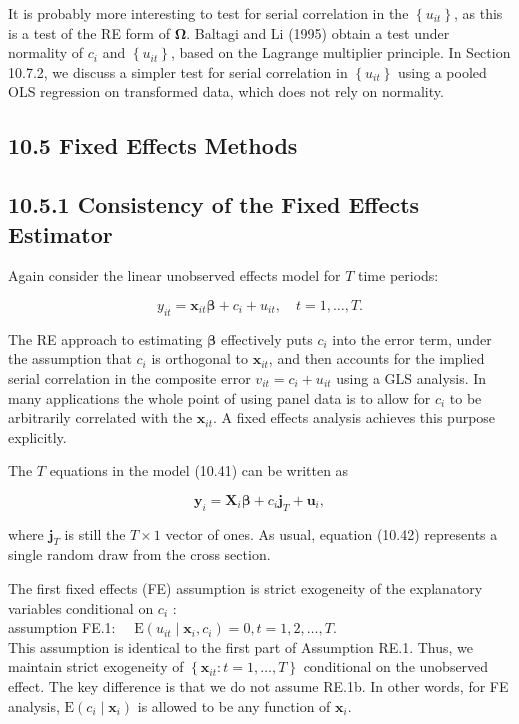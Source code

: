 \documentclass[10pt]{article}
\begin{document}
It is probably more interesting to test for serial correlation in the $\left\{u_{i t}\right\}$, as this is a test of the RE form of $\boldsymbol{\Omega}$. Baltagi and Li (1995) obtain a test under normality of $c_{i}$ and $\left\{u_{i t}\right\}$, based on the Lagrange multiplier principle. In Section 10.7.2, we discuss a simpler test for serial correlation in $\left\{u_{i t}\right\}$ using a pooled OLS regression on transformed data, which does not rely on normality.

\subsection*{10.5 Fixed Effects Methods}
\subsection*{10.5.1 Consistency of the Fixed Effects Estimator}
Again consider the linear unobserved effects model for $T$ time periods:


\begin{equation*}
y_{i t}=\mathbf{x}_{i t} \boldsymbol{\beta}+c_{i}+u_{i t}, \quad t=1, \ldots, T . \tag{10.41}
\end{equation*}


The RE approach to estimating $\boldsymbol{\beta}$ effectively puts $c_{i}$ into the error term, under the assumption that $c_{i}$ is orthogonal to $\mathbf{x}_{i t}$, and then accounts for the implied serial correlation in the composite error $v_{i t}=c_{i}+u_{i t}$ using a GLS analysis. In many applications the whole point of using panel data is to allow for $c_{i}$ to be arbitrarily correlated with the $\mathbf{x}_{i t}$. A fixed effects analysis achieves this purpose explicitly.

The $T$ equations in the model (10.41) can be written as


\begin{equation*}
\mathbf{y}_{i}=\mathbf{X}_{i} \boldsymbol{\beta}+c_{i} \mathbf{j}_{T}+\mathbf{u}_{i}, \tag{10.42}
\end{equation*}


where $\mathbf{j}_{T}$ is still the $T \times 1$ vector of ones. As usual, equation (10.42) represents a single random draw from the cross section.

The first fixed effects (FE) assumption is strict exogeneity of the explanatory variables conditional on $c_{i}$ :\\
assumption FE.1: $\quad \mathrm{E}\left(u_{i t} \mid \mathbf{x}_{i}, c_{i}\right)=0, t=1,2, \ldots, T$.\\
This assumption is identical to the first part of Assumption RE.1. Thus, we maintain strict exogeneity of $\left\{\mathbf{x}_{i t}: t=1, \ldots, T\right\}$ conditional on the unobserved effect. The key difference is that we do not assume RE.1b. In other words, for FE analysis, $\mathrm{E}\left(c_{i} \mid \mathbf{x}_{i}\right)$ is allowed to be any function of $\mathbf{x}_{i}$.
\end{document}
